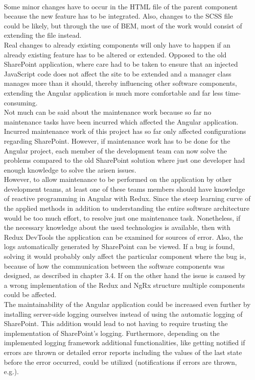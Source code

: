 \documentclass[Bachelor,BIF,english]{twbook}
\begin{document}
\\[\baselineskip]
Some minor changes have to occur in the HTML file of the parent component because the new feature has to be integrated. Also, changes to the SCSS file could be likely, but through the use of BEM, most of the work would consist of extending the file instead. 
\\[\baselineskip]
Real changes to already existing components will only have to happen if an already existing feature has to be altered or extended. Opposed to the old SharePoint application, where care had to be taken to ensure that an injected JavaScript code does not affect the site to be extended and a manager class manages more than it should, thereby influencing other software components, extending the Angular application is much more comfortable and far less time-consuming.
\\[\baselineskip]
Not much can be said about the maintenance work because so far no maintenance tasks have been incurred which affected the Angular application. Incurred maintenance work of this project has so far only affected configurations regarding SharePoint. However, if maintenance work has to be done for the Angular project, each member of the development team can now solve the problems compared to the old SharePoint solution where just one developer had enough knowledge to solve the arisen issues.
\\[\baselineskip]
However, to allow maintenance to be performed on the application by other development teams, at least one of these teams members should have knowledge of reactive programming in Angular with Redux. Since the steep learning curve of the applied methods in addition to understanding the entire software architecture would be too much effort, to resolve just one maintenance task. Nonetheless, if the necessary knowledge about the used technologies is available, then with Redux DevTools the application can be examined for sources of error. Also, the logs automatically generated by SharePoint can be viewed. If a bug is found, solving it would probably only affect the particular component where the bug is, because of how the communication between the software components was designed, as described in chapter 3.4. If on the other hand the issue is caused by a wrong implementation of the Redux and NgRx structure multiple components could be affected.
\\[\baselineskip]
The maintainability of the Angular application could be increased even further by installing server-side logging ourselves instead of using the automatic logging of SharePoint. This addition would lead to not having to require trusting the implementation of SharePoint's logging. Furthermore, depending on the implemented logging framework additional functionalities, like getting notified if errors are thrown or detailed error reports including the values of the last state before the error occurred, could be utilized (notifications if errors are thrown, e.g.).
\end{document}
